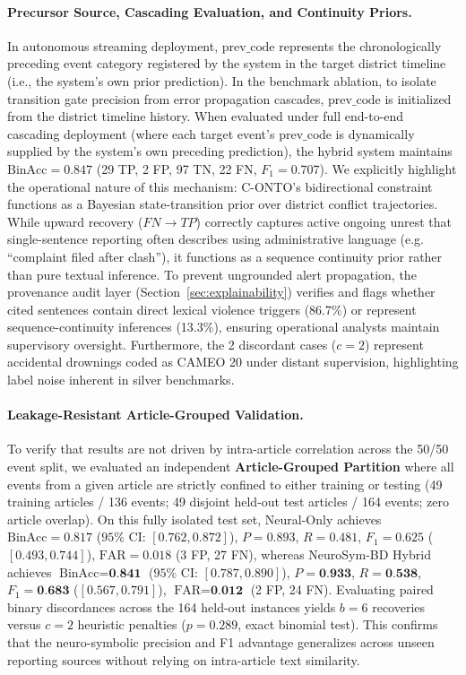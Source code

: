 \documentclass[11pt,a4paper]{article}
\begin{document}
\paragraph{Precursor Source, Cascading Evaluation, and Continuity Priors.}
In autonomous streaming deployment, $\text{prev\_code}$ represents the chronologically preceding event category registered by the system in the target district timeline (i.e., the system's own prior prediction). In the benchmark ablation, to isolate transition gate precision from error propagation cascades, $\text{prev\_code}$ is initialized from the district timeline history. When evaluated under full end-to-end cascading deployment (where each target event's $\text{prev\_code}$ is dynamically supplied by the system's own preceding prediction), the hybrid system maintains $\text{BinAcc} = 0.847$ (29 TP, 2 FP, 97 TN, 22 FN, $F_1 = 0.707$).
We explicitly highlight the operational nature of this mechanism: C-ONTO's bidirectional constraint functions as a Bayesian state-transition prior over district conflict trajectories. While upward recovery ($FN \to TP$) correctly captures active ongoing unrest that single-sentence reporting often describes using administrative language (e.g. ``complaint filed after clash''), it functions as a sequence continuity prior rather than pure textual inference. To prevent ungrounded alert propagation, the provenance audit layer (Section~\ref{sec:explainability}) verifies and flags whether cited sentences contain direct lexical violence triggers (86.7\%) or represent sequence-continuity inferences (13.3\%), ensuring operational analysts maintain supervisory oversight. Furthermore, the 2 discordant cases ($c=2$) represent accidental drownings coded as CAMEO 20 under distant supervision, highlighting label noise inherent in silver benchmarks.

\paragraph{Leakage-Resistant Article-Grouped Validation.}
To verify that results are not driven by intra-article correlation across the 50/50 event split, we evaluated an independent \textbf{Article-Grouped Partition} where all events from a given article are strictly confined to either training or testing (49 training articles / 136 events; 49 disjoint held-out test articles / 164 events; zero article overlap).
On this fully isolated test set, Neural-Only achieves $\text{BinAcc} = 0.817$ ($95\%$ CI: $[0.762, 0.872]$), $P = 0.893$, $R = 0.481$, $F_1 = 0.625$ ($[0.493, 0.744]$), $\text{FAR} = 0.018$ (3 FP, 27 FN), whereas NeuroSym-BD Hybrid achieves $\text{BinAcc} = \textbf{0.841}$ ($95\%$ CI: $[0.787, 0.890]$), $P = \textbf{0.933}$, $R = \textbf{0.538}$, $F_1 = \textbf{0.683}$ ($[0.567, 0.791]$), $\text{FAR} = \textbf{0.012}$ (2 FP, 24 FN).
Evaluating paired binary discordances across the 164 held-out instances yields $b = 6$ recoveries versus $c = 2$ heuristic penalties ($p = 0.289$, exact binomial test).
This confirms that the neuro-symbolic precision and F1 advantage generalizes across unseen reporting sources without relying on intra-article text similarity.
\end{document}
